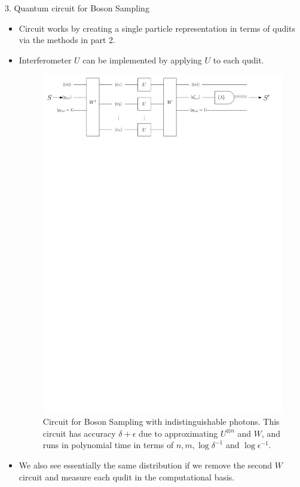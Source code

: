 \documentclass[]{templates/poster}
\begin{document}
\begin{frame}{}
\begin{columns}[t]
\begin{column}{0.422\linewidth}
  \begin{block}{\Large 3. Quantum circuit for Boson Sampling}
  \begin{itemize}
  \item Circuit works by creating a single particle representation in terms of qudits via the methods in part 2.
  \item Interferometer $U$ can be implemented by applying $U$ to each qudit.
  \begin{center}
  \begin{figure}
  \includegraphics[width=\linewidth]{noiseless_circuit_irrep}
  \caption{\label{fig:noiseless-circuit} Circuit for Boson Sampling with indistinguishable photons. This circuit has accuracy $\delta + \epsilon$ due to approximating $U^{\otimes n}$ and $W$, and runs in polynomial time in terms of $n, m, \log\delta^{-1}$ and $\log\epsilon^{-1}$.}
  \end{figure}
  \end{center}
  \item We also see essentially the same distribution if we remove the second $W$ circuit and measure each qudit in the computational basis.
  \end{itemize}
  \end{block}
  \end{column}


\end{columns}
\end{frame}
\end{document}
